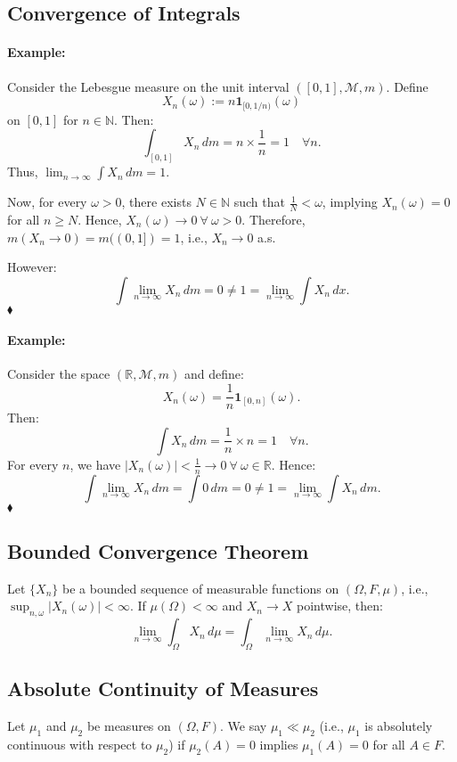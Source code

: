 \documentclass{article}
\newenvironment{example}{\paragraph{Example:}}{\hfill $\blacklozenge $}
\begin{document}
\subsection{Convergence of Integrals}
\begin{example}
Consider the Lebesgue measure on the unit interval $([0, 1], \mathcal{M}, m)$. Define
\[X_n(\omega) := n \mathbf{1}_{[0,1/n)}(\omega)\]
on $[0, 1]$ for $n \in \mathbb{N}$. Then:
\[\int_{[0,1]} X_n \, dm = n \times \frac{1}{n} = 1 \quad \forall n.\]
Thus, $\lim_{n \to \infty} \int X_n \, dm = 1$.

Now, for every $\omega > 0$, there exists $N \in \mathbb{N}$ such that $\frac{1}{N} < \omega$, implying $X_n(\omega) = 0$ for all $n \geq N$. Hence, $X_n(\omega) \to 0 \ \forall \ \omega > 0$. Therefore, $m(X_n \to 0) = m((0, 1]) = 1$, i.e., $X_n \to 0$ a.s.

However:
\[\int \lim_{n \to \infty} X_n \, dm = 0 \neq 1 = \lim_{n \to \infty} \int X_n \, dx.\]
\end{example}

\begin{example}
Consider the space $(\mathbb{R}, \mathcal{M}, m)$ and define:
\[X_n(\omega) = \frac{1}{n} \mathbf{1}_{[0,n]}(\omega).\]
Then:
\[\int X_n \, dm = \frac{1}{n} \times n = 1 \quad \forall n.\]
For every $n$, we have $|X_n(\omega)| < \frac{1}{n} \to 0 \ \forall \ \omega \in \mathbb{R}$. Hence:
\[\int \lim_{n \to \infty} X_n \, dm = \int 0 \, dm = 0 \neq 1 = \lim_{n \to \infty} \int X_n \, dm.\]
\end{example}

\subsection{Bounded Convergence Theorem}
Let $\{X_n\}$ be a bounded sequence of measurable functions on $(\Omega, F, \mu)$, i.e., $\sup_{n,\omega} |X_n(\omega)| < \infty$. If $\mu(\Omega) < \infty$ and $X_n \to X$ pointwise, then:
\[\lim_{n \to \infty} \int_\Omega X_n \, d\mu = \int_\Omega \lim_{n \to \infty} X_n \, d\mu.\]

\subsection{Absolute Continuity of Measures}
Let $\mu_1$ and $\mu_2$ be measures on $(\Omega, F)$. We say $\mu_1 \ll \mu_2$ (i.e., $\mu_1$ is absolutely continuous with respect to $\mu_2$) if $\mu_2(A) = 0$ implies $\mu_1(A) = 0$ for all $A \in F$.
\end{document}
